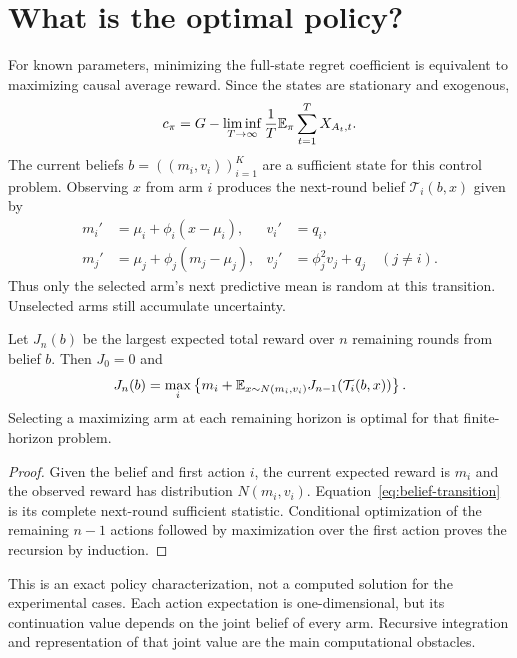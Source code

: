 \section{What is the optimal policy?}
\label{sec:optimal-control}
For known parameters, minimizing the full-state regret coefficient is equivalent to maximizing causal average reward. Since the states are stationary and exogenous,
\begin{equation}
c_\pi=G-\liminf_{T\to\infty}\frac1T\mathbb E_\pi\sum_{t=1}^TX_{A_t,t}.
\label{eq:gain-equivalence}
\end{equation}
The current beliefs $b=((m_i,v_i))_{i=1}^K$ are a sufficient state for this control problem. Observing $x$ from arm $i$ produces the next-round belief $\mathcal T_i(b,x)$ given by
\begin{align}
m_i'&=\mu_i+\phi_i(x-\mu_i), &v_i'&=q_i,\nonumber\\
m_j'&=\mu_j+\phi_j(m_j-\mu_j), &v_j'&=\phi_j^2v_j+q_j\quad(j\ne i).
\label{eq:belief-transition}
\end{align}
Thus only the selected arm's next predictive mean is random at this transition. Unselected arms still accumulate uncertainty.

\begin{proposition}
Let $J_n(b)$ be the largest expected total reward over $n$ remaining rounds from belief $b$. Then $J_0=0$ and
\begin{equation}
J_n(b)=\max_i\left\{m_i+\mathbb E_{x\sim N(m_i,v_i)}J_{n-1}(\mathcal T_i(b,x))\right\}.
\label{eq:finite-bellman}
\end{equation}
Selecting a maximizing arm at each remaining horizon is optimal for that finite-horizon problem.
\end{proposition}
\begin{proof}
Given the belief and first action $i$, the current expected reward is $m_i$ and the observed reward has distribution $N(m_i,v_i)$. Equation~\eqref{eq:belief-transition} is its complete next-round sufficient statistic. Conditional optimization of the remaining $n-1$ actions followed by maximization over the first action proves the recursion by induction.
\end{proof}
This is an exact policy characterization, not a computed solution for the experimental cases. Each action expectation is one-dimensional, but its continuation value depends on the joint belief of every arm. Recursive integration and representation of that joint value are the main computational obstacles.

